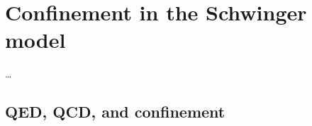 \documentclass[../main.tex]{subfiles} %
\begin{document}
\chapter{Confinement in the Schwinger model}

\ldots



\section{QED, QCD, and confinement}

\lipsum[1-2]
\end{document}
